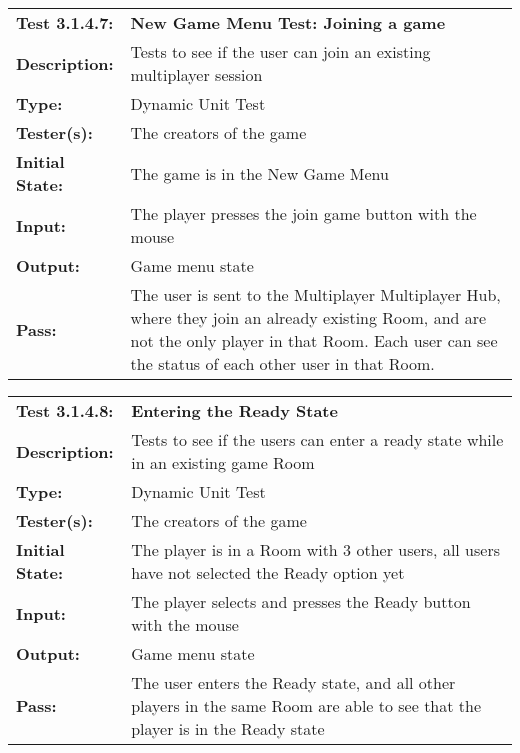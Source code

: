 \documentclass[12pt, titlepage]{article}
\begin{document}
\begin{mdframed}[linewidth=1pt]
\begin{tabularx}{\textwidth}{@{}p{3cm}X@{}}
{\bf Test 3.1.4.7:} & {\bf New Game Menu Test: Joining a game}\\[\baselineskip]
{\bf Description:} & Tests to see if the user can join an existing multiplayer session\\[0.5\baselineskip]
{\bf Type:} & Dynamic Unit Test\\[0.5\baselineskip]
{\bf Tester(s):} & The creators of the game\\[0.5\baselineskip]
{\bf Initial State:} & The game is in the New Game Menu\\[0.5\baselineskip]
{\bf Input:} & The player presses the join game button with the mouse \\[0.5\baselineskip]
{\bf Output:} & Game menu state\\[0.5\baselineskip]
{\bf Pass:} & The user is sent to the Multiplayer Multiplayer Hub, where they join an already existing Room, and are not the only player in that Room. Each user can see the status of each other user in that Room.
\end{tabularx}
\end{mdframed}

\begin{mdframed}[linewidth=1pt]
\begin{tabularx}{\textwidth}{@{}p{3cm}X@{}}
{\bf Test 3.1.4.8:} & {\bf Entering the Ready State}\\[\baselineskip]
{\bf Description:} & Tests to see if the users can enter a ready state while in an existing game Room\\[0.5\baselineskip]
{\bf Type:} & Dynamic Unit Test\\[0.5\baselineskip]
{\bf Tester(s):} & The creators of the game\\[0.5\baselineskip]
{\bf Initial State:} & The player is in a Room with 3 other users, all users have not selected the Ready option yet\\[0.5\baselineskip]
{\bf Input:} & The player selects and presses the Ready button with the mouse \\[0.5\baselineskip]
{\bf Output:} & Game menu state\\[0.5\baselineskip]
{\bf Pass:} & The user enters the Ready state, and all other players in the same Room are able to see that the player is in the Ready state
\end{tabularx}
\end{mdframed}
\end{document}
